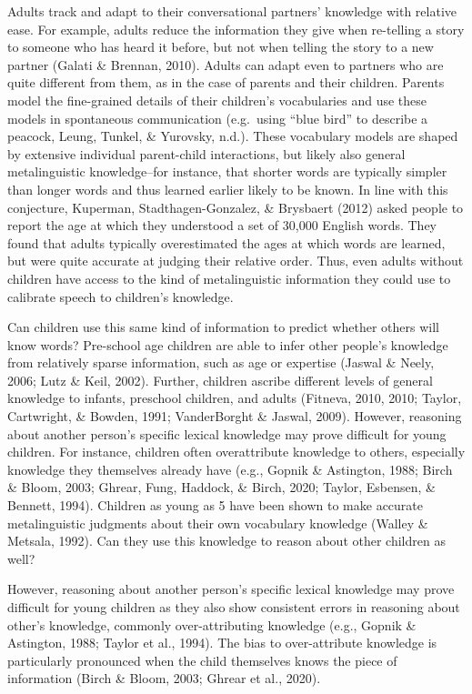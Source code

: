 \documentclass[10pt, letterpaper]{article}
\begin{document}
Adults track and adapt to their conversational partners' knowledge with
relative ease. For example, adults reduce the information they give when
re-telling a story to someone who has heard it before, but not when
telling the story to a new partner (Galati \& Brennan, 2010). Adults can
adapt even to partners who are quite different from them, as in the case
of parents and their children. Parents model the fine-grained details of
their children's vocabularies and use these models in spontaneous
communication (e.g.~using ``blue bird'' to describe a peacock, Leung,
Tunkel, \& Yurovsky, n.d.). These vocabulary models are shaped by
extensive individual parent-child interactions, but likely also general
metalinguistic knowledge--for instance, that shorter words are typically
simpler than longer words and thus learned earlier likely to be known.
In line with this conjecture, Kuperman, Stadthagen-Gonzalez, \&
Brysbaert (2012) asked people to report the age at which they understood
a set of 30,000 English words. They found that adults typically
overestimated the ages at which words are learned, but were quite
accurate at judging their relative order. Thus, even adults without
children have access to the kind of metalinguistic information they
could use to calibrate speech to children's knowledge.

Can children use this same kind of information to predict whether others
will know words? Pre-school age children are able to infer other
people's knowledge from relatively sparse information, such as age or
expertise (Jaswal \& Neely, 2006; Lutz \& Keil, 2002). Further, children
ascribe different levels of general knowledge to infants, preschool
children, and adults (Fitneva, 2010, 2010; Taylor, Cartwright, \&
Bowden, 1991; VanderBorght \& Jaswal, 2009). However, reasoning about
another person's specific lexical knowledge may prove difficult for
young children. For instance, children often overattribute knowledge to
others, especially knowledge they themselves already have (e.g., Gopnik
\& Astington, 1988; Birch \& Bloom, 2003; Ghrear, Fung, Haddock, \&
Birch, 2020; Taylor, Esbensen, \& Bennett, 1994). Children as young as 5
have been shown to make accurate metalinguistic judgments about their
own vocabulary knowledge (Walley \& Metsala, 1992). Can they use this
knowledge to reason about other children as well?

However, reasoning about another person's specific lexical knowledge may
prove difficult for young children as they also show consistent errors
in reasoning about other's knowledge, commonly over-attributing
knowledge (e.g., Gopnik \& Astington, 1988; Taylor et al., 1994). The
bias to over-attribute knowledge is particularly pronounced when the
child themselves knows the piece of information (Birch \& Bloom, 2003;
Ghrear et al., 2020).
\end{document}
